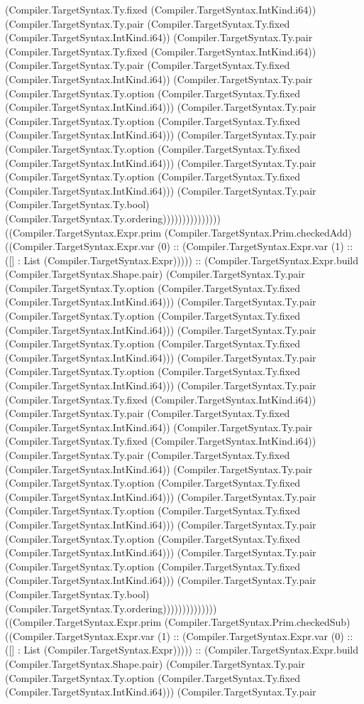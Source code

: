 \documentclass[11pt]{article}
\begin{document}
(Compiler.TargetSyntax.Ty.fixed (Compiler.TargetSyntax.IntKind.i64)) (Compiler.TargetSyntax.Ty.pair (Compiler.TargetSyntax.Ty.fixed (Compiler.TargetSyntax.IntKind.i64)) (Compiler.TargetSyntax.Ty.pair (Compiler.TargetSyntax.Ty.fixed (Compiler.TargetSyntax.IntKind.i64)) (Compiler.TargetSyntax.Ty.pair (Compiler.TargetSyntax.Ty.fixed (Compiler.TargetSyntax.IntKind.i64)) (Compiler.TargetSyntax.Ty.pair (Compiler.TargetSyntax.Ty.option (Compiler.TargetSyntax.Ty.fixed (Compiler.TargetSyntax.IntKind.i64))) (Compiler.TargetSyntax.Ty.pair (Compiler.TargetSyntax.Ty.option (Compiler.TargetSyntax.Ty.fixed (Compiler.TargetSyntax.IntKind.i64))) (Compiler.TargetSyntax.Ty.pair (Compiler.TargetSyntax.Ty.option (Compiler.TargetSyntax.Ty.fixed (Compiler.TargetSyntax.IntKind.i64))) (Compiler.TargetSyntax.Ty.pair (Compiler.TargetSyntax.Ty.option (Compiler.TargetSyntax.Ty.fixed (Compiler.TargetSyntax.IntKind.i64))) (Compiler.TargetSyntax.Ty.pair (Compiler.TargetSyntax.Ty.bool) (Compiler.TargetSyntax.Ty.ordering))))))))))))))) ((Compiler.TargetSyntax.Expr.prim (Compiler.TargetSyntax.Prim.checkedAdd) ((Compiler.TargetSyntax.Expr.var (0) :: (Compiler.TargetSyntax.Expr.var (1) :: ([] : List (Compiler.TargetSyntax.Expr))))) :: (Compiler.TargetSyntax.Expr.build (Compiler.TargetSyntax.Shape.pair) (Compiler.TargetSyntax.Ty.pair (Compiler.TargetSyntax.Ty.option (Compiler.TargetSyntax.Ty.fixed (Compiler.TargetSyntax.IntKind.i64))) (Compiler.TargetSyntax.Ty.pair (Compiler.TargetSyntax.Ty.option (Compiler.TargetSyntax.Ty.fixed (Compiler.TargetSyntax.IntKind.i64))) (Compiler.TargetSyntax.Ty.pair (Compiler.TargetSyntax.Ty.option (Compiler.TargetSyntax.Ty.fixed (Compiler.TargetSyntax.IntKind.i64))) (Compiler.TargetSyntax.Ty.pair (Compiler.TargetSyntax.Ty.option (Compiler.TargetSyntax.Ty.fixed (Compiler.TargetSyntax.IntKind.i64))) (Compiler.TargetSyntax.Ty.pair (Compiler.TargetSyntax.Ty.fixed (Compiler.TargetSyntax.IntKind.i64)) (Compiler.TargetSyntax.Ty.pair (Compiler.TargetSyntax.Ty.fixed (Compiler.TargetSyntax.IntKind.i64)) (Compiler.TargetSyntax.Ty.pair (Compiler.TargetSyntax.Ty.fixed (Compiler.TargetSyntax.IntKind.i64)) (Compiler.TargetSyntax.Ty.pair (Compiler.TargetSyntax.Ty.fixed (Compiler.TargetSyntax.IntKind.i64)) (Compiler.TargetSyntax.Ty.pair (Compiler.TargetSyntax.Ty.option (Compiler.TargetSyntax.Ty.fixed (Compiler.TargetSyntax.IntKind.i64))) (Compiler.TargetSyntax.Ty.pair (Compiler.TargetSyntax.Ty.option (Compiler.TargetSyntax.Ty.fixed (Compiler.TargetSyntax.IntKind.i64))) (Compiler.TargetSyntax.Ty.pair (Compiler.TargetSyntax.Ty.option (Compiler.TargetSyntax.Ty.fixed (Compiler.TargetSyntax.IntKind.i64))) (Compiler.TargetSyntax.Ty.pair (Compiler.TargetSyntax.Ty.option (Compiler.TargetSyntax.Ty.fixed (Compiler.TargetSyntax.IntKind.i64))) (Compiler.TargetSyntax.Ty.pair (Compiler.TargetSyntax.Ty.bool) (Compiler.TargetSyntax.Ty.ordering)))))))))))))) ((Compiler.TargetSyntax.Expr.prim (Compiler.TargetSyntax.Prim.checkedSub) ((Compiler.TargetSyntax.Expr.var (1) :: (Compiler.TargetSyntax.Expr.var (0) :: ([] : List (Compiler.TargetSyntax.Expr))))) :: (Compiler.TargetSyntax.Expr.build (Compiler.TargetSyntax.Shape.pair) (Compiler.TargetSyntax.Ty.pair (Compiler.TargetSyntax.Ty.option (Compiler.TargetSyntax.Ty.fixed (Compiler.TargetSyntax.IntKind.i64))) (Compiler.TargetSyntax.Ty.pair 
\end{document}
